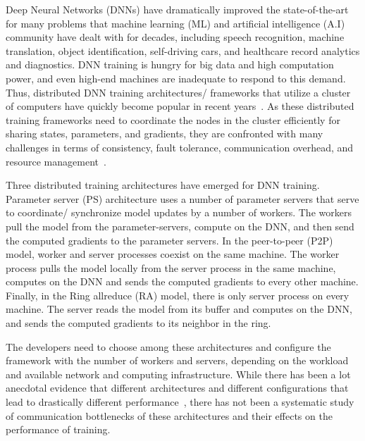 \documentclass[conference]{IEEEtran}
\begin{document}
Deep Neural Networks (DNNs) have dramatically improved the state-of-the-art for many problems that machine learning (ML) and artificial intelligence (A.I) community have dealt with for decades, including speech recognition, machine translation, object identification, self-driving cars, and healthcare record analytics and diagnostics. DNN training is hungry for big data and high computation power, and even high-end machines are inadequate to respond to this demand\cite{memory}. Thus, distributed DNN training architectures/ frameworks that utilize a cluster of computers have quickly become popular in recent years~\cite{abadi2016tensorflow,sergeev2018horovod}.
As these distributed training frameworks need to coordinate the nodes in the cluster efficiently for sharing states, parameters, and gradients, they are confronted with many challenges in terms of consistency, fault tolerance, communication overhead, and resource management~\cite{challengings}. 

Three distributed training architectures have emerged for DNN training. Parameter server (PS) architecture uses a number of parameter servers that serve to coordinate/ synchronize model updates by a number of workers.
The workers pull the model from the parameter-servers, compute on the DNN, and then send the computed gradients to the parameter servers. In the peer-to-peer (P2P) model, worker and server processes coexist on the same machine. The worker process pulls the model locally from the server process in the same machine, computes on the DNN and sends the computed gradients to every other machine. Finally, in the Ring allreduce (RA) model, there is only server process on every machine. The server reads the model from its buffer and computes on the DNN, and sends the computed gradients to its neighbor in the ring. 


The developers need to choose among these architectures and configure the framework with the number of workers and servers, depending on the workload and available network and computing infrastructure. While there has been a lot anecdotal evidence that different architectures and different configurations that lead to drastically different performance~\cite{ben2018demystifying}, there has not been a systematic study of communication bottlenecks of these architectures and their effects on the performance of training.
\end{document}
